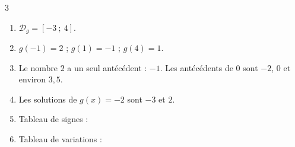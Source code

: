 \documentclass[10pt,a4paper]{article}
\begin{document}
\begin{corr}{3}
\begin{enumerate}[leftmargin=*]
    \item \(\mathcal{D}_g=[-3\ ;\ 4]\).
    \item \(g(-1)=2\) ; \(g(1)=-1\) ; \(g(4)=1\).
    \item Le nombre \(2\) a un seul antécédent : \(-1\). Les antécédents de \(0\) sont \(-2\), \(0\) et environ \(3,5\).
    \item Les solutions de \(g(x)=-2\) sont \(-3\) et \(2\).
    \item Tableau de signes :
    \begin{center}
    \end{center}
    \item Tableau de variations :
    \begin{center}
    \end{center}
\end{enumerate}
\end{corr}
\end{document}

